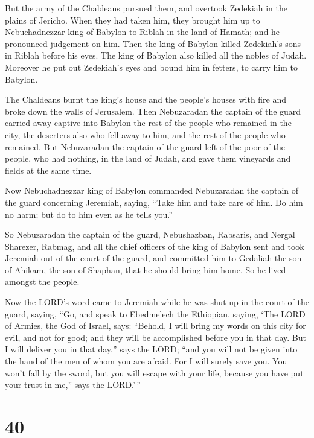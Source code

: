  But the army of the Chaldeans pursued them, and overtook
Zedekiah in the plains of Jericho. When they had taken him, they brought
him up to Nebuchadnezzar king of Babylon to Riblah in the land of
Hamath; and he pronounced judgement on him.  Then the king
of Babylon killed Zedekiah's sons in Riblah before his eyes. The king of
Babylon also killed all the nobles of Judah.  Moreover he
put out Zedekiah's eyes and bound him in fetters, to carry him to
Babylon.

 The Chaldeans burnt the king's house and the people's
houses with fire and broke down the walls of Jerusalem. 
Then Nebuzaradan the captain of the guard carried away captive into
Babylon the rest of the people who remained in the city, the deserters
also who fell away to him, and the rest of the people who remained.
 But Nebuzaradan the captain of the guard left of the poor
of the people, who had nothing, in the land of Judah, and gave them
vineyards and fields at the same time.

 Now Nebuchadnezzar king of Babylon commanded Nebuzaradan
the captain of the guard concerning Jeremiah, saying, 
``Take him and take care of him. Do him no harm; but do to him even as
he tells you.''

 So Nebuzaradan the captain of the guard, Nebushazban,
Rabsaris, and Nergal Sharezer, Rabmag, and all the chief officers of the
king of Babylon  sent and took Jeremiah out of the court of
the guard, and committed him to Gedaliah the son of Ahikam, the son of
Shaphan, that he should bring him home. So he lived amongst the people.

 Now the LORD's word came to Jeremiah while he was shut up
in the court of the guard, saying,  ``Go, and speak to
Ebedmelech the Ethiopian, saying, `The LORD of Armies, the God of
Israel, says: ``Behold, I will bring my words on this city for evil, and
not for good; and they will be accomplished before you in that day.
 But I will deliver you in that day,'' says the LORD; ``and
you will not be given into the hand of the men of whom you are afraid.
 For I will surely save you. You won't fall by the sword,
but you will escape with your life, because you have put your trust in
me,'' says the LORD.'\,''

\hypertarget{section-39}{%
\section{40}\label{section-39}}

